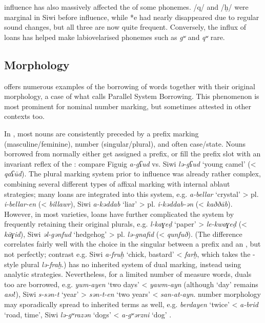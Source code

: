 \documentclass[output=paper]{langsci/langscibook}
\begin{document}
 influence has also massively affected the  of some phonemes. /q/ and /ḫ/ were marginal in Siwi before  influence, while *e had nearly disappeared due to regular sound changes, but all three are now quite frequent. Conversely, the influx of  loans has helped make labiovelarised phonemes such as \textit{gʷ} and \textit{qʷ} rare.


 
 \subsection{Morphology} \label{morph}


 offers numerous examples of the borrowing of  words together with their original   morphology, a case of what \citet{Kossmann2010} calls Parallel System Borrowing. This phenomenon is most prominent for nominal number marking, but sometimes attested in other contexts too.

In , most nouns are consistently preceded by a prefix marking  (masculine/feminine), number (singular/plural), and often case/state. Nouns borrowed from  normally either get assigned a  prefix, or fill the prefix slot with an invariant reflex of the   : compare Figuig \textit{a-gʕud} vs. Siwi \textit{lə-gʕud} `young camel' (< \textit{qaʕūd}). The  plural marking system prior to  influence was already rather complex, combining several different types of affixal marking with internal ablaut strategies; many  loans are integrated into this system, e.g.  \textit{a-bellar} `crystal' > pl. \textit{i-bellar-en} (< \textit{billawr}), Siwi \textit{a-kəddab} `liar' > pl. \textit{i-kəddab-ən} (< \textit{kaððāb}). However, in most  varieties,  loans have further complicated the system by frequently retaining their original plurals, e.g.  \textit{l-kaɣeḍ} `paper' > \textit{le-kwaɣeḍ} (< \textit{kāɣid}), Siwi \textit{əl-gənfud} `hedgehog' > pl. \textit{lə-gnafid} (< \textit{qunfuð}). (The difference correlates fairly well with the choice in the singular between a  prefix and an  , but not perfectly; contrast e.g. Siwi \textit{a-fruḫ} `chick, bastard' < \textit{farḫ}, which takes the -style plural \textit{lə-fraḫ}.)   has no inherited system of dual marking, instead using analytic strategies. Nevertheless, for a limited number of measure words, duals too are borrowed, e.g.  \textit{yum-ayen} `two days' < \textit{yawm-ayn} (although `day' remains \textit{ass}!), Siwi \textit{s-sən-t} `year' > \textit{sən-t-en} `two years' < \textit{san-at-ayn}.   number morphology may sporadically spread to inherited terms as well, e.g.  \textit{berdayen} `twice' < \textit{a-brid} `road, time', Siwi \textit{lə-gʷrazən} `dogs' < \textit{a-gʷərzni} `dog' \citep{Souag2013book}.
\end{document}
